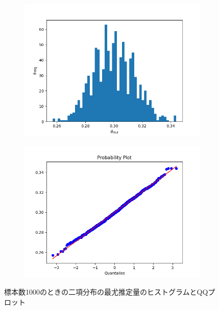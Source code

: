 \documentclass[class=jsarticle, crop=false, dvipdfmx, fleqn]{standalone}
\begin{document}
\begin{figure}
	\centering
    \begin{minipage}{0.45\linewidth}
        \begin{figure}[H]
            \centering
            \includegraphics[clip, width=\linewidth]{../figures/hist_n1000.png}
            \label{fig:hist_n1000}
        \end{figure}
    \end{minipage}
    \begin{minipage}{0.45\linewidth}
        \begin{figure}[H]
            \centering
            \includegraphics[clip, width=\linewidth]{../figures/qqplot_n1000.png}
            \label{fig:qqplot_n1000}
        \end{figure}
    \end{minipage}
    \caption{標本数1000のときの二項分布の最尤推定量のヒストグラムとQQプロット}
    \label{fig:n1000}
\end{figure}
\end{document}
